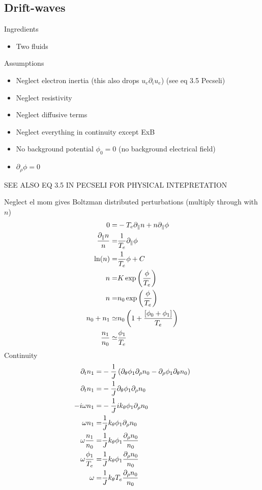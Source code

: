 \subsection{Drift-waves}
Ingredients
%
\begin{itemize}
    \item Two fluids
\end{itemize}
%
Assumptions
\begin{itemize}
    \item Neglect electron inertia (this also drops $u_e \partial_i u_e$) (see eq 3.5 Pecseli)
    \item Neglect resistivity
    \item Neglect diffusive terms
    \item Neglect everything in continuity except ExB
    \item No background potential $\phi_0 = 0$ (no background electrical field)
    \item $\partial_\rho\phi = 0$
\end{itemize}
SEE ALSO EQ 3.5 IN PECSELI FOR PHYSICAL INTEPRETATION

Neglect el mom gives Boltzman distributed perturbations (multiply through with $n$)
\begin{align*}
    0 =& -T_e\partial_\| n + n\partial_\|\phi\\
    \frac{\partial_\| n}{n} =& \frac{1}{T_e}\partial_\|\phi\\
    \ln(n) =& \frac{1}{T_e}\phi + C\\
    n =& K\exp\left(\frac{\phi }{T_e}\right)\\
    n =& n_0\exp\left(\frac{\phi}{T_e}\right)\\
    n_0 + n_1 \simeq& n_0\left(1 + \frac{[\phi_0 + \phi_1]}{T_e}\right)\\
    \frac{n_1}{n_0} \simeq&  \frac{\phi_1}{T_e}
\end{align*}
Continuity
\begin{align*}
 \partial_t n_1
=&
 -\frac{1}{J}\left(
  \partial_\theta\phi_1\partial_\rho n_0
 - \partial_\rho\phi_1\partial_\theta n_0
 \right)
 \\
 \partial_t n_1
=&
 -\frac{1}{J}
  \partial_\theta\phi_1\partial_\rho n_0
 \\
 -i\omega n_1
=&
 -\frac{1}{J} ik_\theta\phi_1\partial_\rho n_0
 \\
 \omega n_1
=&
 \frac{1}{J} k_\theta\phi_1\partial_\rho n_0
 \\
 \omega \frac{n_1}{n_0}
=&
 \frac{1}{J} k_\theta\phi_1\frac{\partial_\rho n_0}{n_0}
 \\
 \omega \frac{\phi_1}{T_e}
=&
 \frac{1}{J} k_\theta\phi_1\frac{\partial_\rho n_0}{n_0}
 \\
 \omega
=&
 \frac{1}{J}k_\theta T_e \frac{\partial_\rho n_0}{n_0}
\end{align*}

